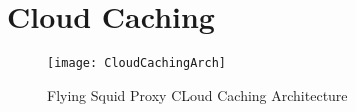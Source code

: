 \section{Cloud Caching}


\begin{figure}[H] \centering
\texttt{[image: CloudCachingArch]}
\caption{Flying Squid Proxy CLoud Caching Architecture}
\end{figure}

